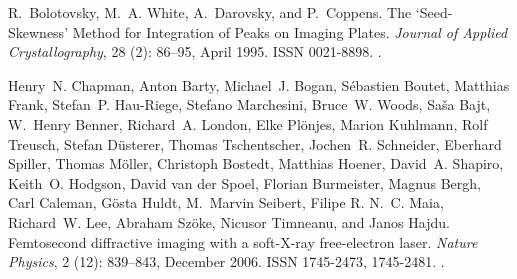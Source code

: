\documentclass[a4paper]{article}
\begin{document}
\begin{thebibliography}{33}
R.~Bolotovsky, M.~A. White, A.~Darovsky, and P.~Coppens.
\newblock The `{{Seed-Skewness}}' {{Method}} for {{Integration}} of {{Peaks}}
  on {{Imaging Plates}}.
\newblock \emph{Journal of Applied Crystallography}, 28 (2):
  86--95, April 1995.
\newblock ISSN 0021-8898.
\newblock {}.

Henry~N. Chapman, Anton Barty, Michael~J. Bogan, S{\'e}bastien Boutet, Matthias
  Frank, Stefan~P. {Hau-Riege}, Stefano Marchesini, Bruce~W. Woods, Sa{\v s}a
  Bajt, W.~Henry Benner, Richard~A. London, Elke Pl{\"o}njes, Marion Kuhlmann,
  Rolf Treusch, Stefan D{\"u}sterer, Thomas Tschentscher, Jochen~R. Schneider,
  Eberhard Spiller, Thomas M{\"o}ller, Christoph Bostedt, Matthias Hoener,
  David~A. Shapiro, Keith~O. Hodgson, David {van der Spoel}, Florian
  Burmeister, Magnus Bergh, Carl Caleman, G{\"o}sta Huldt, M.~Marvin Seibert,
  Filipe R. N.~C. Maia, Richard~W. Lee, Abraham Sz{\"o}ke, Nicusor Timneanu,
  and Janos Hajdu.
\newblock Femtosecond diffractive imaging with a soft-{{X-ray}} free-electron
  laser.
\newblock \emph{Nature Physics}, 2 (12): 839--843, December
  2006.
\newblock ISSN 1745-2473, 1745-2481.
\newblock {}.


\end{thebibliography}
\end{document}
